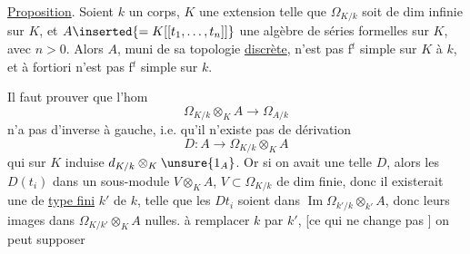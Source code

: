 
\uline{Proposition}. Soient $k$ un corps, $K$ une extension
telle que $\Omega_{K/k}$ soit de dim infinie sur
$K$, et $A\inserted{=K[[t_1,\ldots,t_n]]}$ une algèbre de séries formelles
sur $K$, avec $n>0$. Alors $A$, muni de sa
topologie \uline{discrète}, n'est pas f$^t$ simple sur $K$
 à $k$, et à fortiori n'est pas f$^t$ simple sur $k$.

Il faut prouver que l'hom
\[
\Omega_{K/k}\otimes_K A\longrightarrow\Omega_{A/k}
\]
n'a pas d'inverse à gauche, i.e. qu'il
n'existe pas de dérivation
\[
D:A\longrightarrow\Omega_{K/k}\otimes_K A
\]
qui sur $K$ induise $d_{K/k}\otimes_K\unsure{1_A}$. Or
si on avait une telle $D$, alors les
$D(t_i)$  dans un sous-module
$V\otimes_K A$, $V\subset\Omega_{K/k}$ de dim finie, donc
il existerait une  de \uline{type fini}
$k'$ de $k$, telle que les $Dt_i$ soient dans
$\operatorname{Im}\Omega_{k'/k}\otimes_{k'}A$, donc leurs images dans
$\Omega_{K/k'}\otimes_K A$  nulles. 
à remplacer $k$ par $k'$, [ce qui
ne change pas ] on peut supposer


